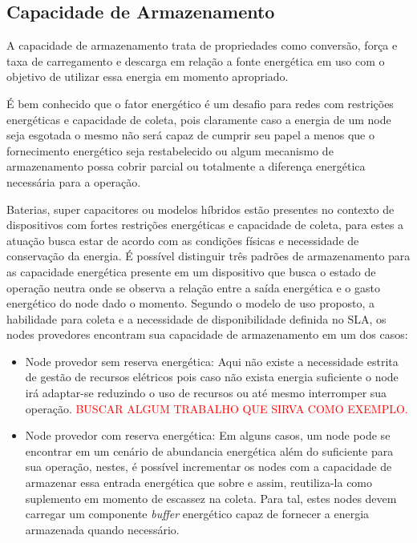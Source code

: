 \subsection{Capacidade de Armazenamento}
A capacidade de armazenamento trata de propriedades como conversão, força e taxa de carregamento e descarga em relação a fonte energética em uso com o objetivo de utilizar essa energia em momento apropriado. 

É bem conhecido que o fator energético é um desafio para redes com restrições energéticas e capacidade de coleta, pois claramente caso a energia de um node seja esgotada o mesmo não será capaz de cumprir seu papel a menos que o fornecimento energético seja restabelecido ou algum mecanismo de armazenamento possa cobrir parcial ou totalmente a diferença energética necessária para a operação.

Baterias, super capacitores ou modelos híbridos estão presentes no contexto de dispositivos com fortes restrições energéticas e capacidade de coleta, para estes a atuação busca estar de acordo com as condições físicas e necessidade de conservação da energia. É possível distinguir três padrões de armazenamento para as capacidade energética presente em um dispositivo que busca o estado de operação neutra onde se observa a relação entre a saída energética e o gasto energético do node dado o momento. Segundo o modelo de uso proposto, a habilidade para coleta e a necessidade de disponibilidade definida no \acs{SLA}, os nodes provedores encontram sua capacidade de armazenamento em um dos casos:

\begin{itemize}
    \item Node provedor sem reserva energética: Aqui não existe a necessidade estrita de gestão de recursos elétricos pois caso não exista energia suficiente o node irá adaptar-se reduzindo o uso de recursos ou até mesmo interromper sua operação. \textcolor{red}{BUSCAR ALGUM TRABALHO QUE SIRVA COMO EXEMPLO.}
    
    \item Node provedor com reserva energética: Em alguns casos, um node pode se encontrar em um cenário de abundancia energética além do suficiente para sua operação, nestes, é possível incrementar os nodes com a capacidade de armazenar essa entrada energética que sobre e assim, reutiliza-la como suplemento em momento de escassez na coleta. Para tal, estes nodes devem carregar um componente \textit{buffer} energético capaz de fornecer a energia armazenada quando necessário.
    
\end{itemize}

